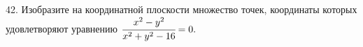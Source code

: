 42. Изобразите на координатной плоскости множество точек, координаты которых удовлетворяют уравнению $\cfrac{x^2-y^2}{x^2+y^2-16}=0.$\\
